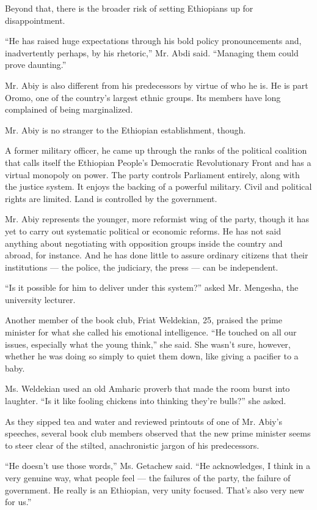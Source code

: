 Beyond that, there is the broader risk of setting Ethiopians up for
disappointment.

``He has raised huge expectations through his bold policy pronouncements
and, inadvertently perhaps, by his rhetoric,'' Mr. Abdi said. ``Managing
them could prove daunting.''

Mr. Abiy is also different from his predecessors by virtue of who he is.
He is part Oromo, one of the country's largest ethnic groups. Its
members have long complained of being marginalized.

Mr. Abiy is no stranger to the Ethiopian establishment, though.

A former military officer, he came up through the ranks of the political
coalition that calls itself the Ethiopian People's Democratic
Revolutionary Front and has a virtual monopoly on power. The party
controls Parliament entirely, along with the justice system. It enjoys
the backing of a powerful military. Civil and political rights are
limited. Land is controlled by the government.

Mr. Abiy represents the younger, more reformist wing of the party,
though it has yet to carry out systematic political or economic reforms.
He has not said anything about negotiating with opposition groups inside
the country and abroad, for instance. And he has done little to assure
ordinary citizens that their institutions --- the police, the judiciary,
the press --- can be independent.

``Is it possible for him to deliver under this system?'' asked Mr.
Mengesha, the university lecturer.

Another member of the book club, Friat Weldekian, 25, praised the prime
minister for what she called his emotional intelligence. ``He touched on
all our issues, especially what the young think,'' she said. She wasn't
sure, however, whether he was doing so simply to quiet them down, like
giving a pacifier to a baby.

Ms. Weldekian used an old Amharic proverb that made the room burst into
laughter. ``Is it like fooling chickens into thinking they're bulls?''
she asked.

As they sipped tea and water and reviewed printouts of one of Mr. Abiy's
speeches, several book club members observed that the new prime minister
seems to steer clear of the stilted, anachronistic jargon of his
predecessors.

``He doesn't use those words,'' Ms. Getachew said. ``He acknowledges, I
think in a very genuine way, what people feel --- the failures of the
party, the failure of government. He really is an Ethiopian, very unity
focused. That's also very new for us.''


